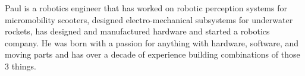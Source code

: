

\begin{cvparagraph}

Paul is a robotics engineer that has worked on robotic perception systems for
micromobility scooters, designed electro-mechanical subsystems for underwater
rockets, has designed and manufactured hardware and started a robotics company.
He was born with a passion for anything with hardware, software, and moving
parts and has over a decade of experience building combinations of those 3
things. 
\end{cvparagraph}
